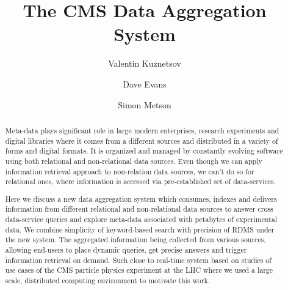 \documentclass[1p,times]{elsarticle}
\begin{document}
\begin{frontmatter}



\dochead{}

\title{The CMS Data Aggregation System}


\author[vkuznet]{Valentin Kuznetsov}
\address[vkuznet]{Cornell University, Ithaca, New York, USA}

\author[evans]{Dave Evans}
\address[evans]{Fermilab, Batavia, Illinois, USA}

\author[metson]{Simon Metson}
\address[metson]{Bristol University, Bristol, UK}


\begin{abstract}
Meta-data plays significant role in large modern enterprises, 
research experiments and digital libraries where it comes from a different 
sources and distributed in a variety of forms and digital formats. 
It is organized and managed by constantly evolving software using 
both relational and non-relational data sources. Even though we can apply
information retrieval approach to non-relation data sources,
we can't do so for relational ones, where information is accessed via
pre-established set of data-services.

Here we discuss a new data aggregation system which consumes, 
indexes and delivers information from different relational and 
non-relational data sources to answer cross data-service queries 
and explore meta-data associated with petabytes of experimental data. 
We combine simplicity of keyword-based search with precision of RDMS
under the new system. The aggregated information being collected from various sources,
allowing end-users to place dynamic queries, get precise answers and 
trigger information retrieval on demand. Such close to real-time system 
based on studies  of use cases of the CMS particle physics experiment at 
the LHC where we used a large scale, distributed computing environment 
to motivate this work.
\end{abstract}


\end{frontmatter}
\end{document}
